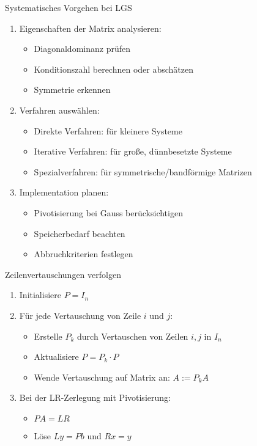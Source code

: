 \begin{KR}{Systematisches Vorgehen bei LGS}
\begin{enumerate}
    \item Eigenschaften der Matrix analysieren:
    \begin{itemize}
        \item Diagonaldominanz prüfen
        \item Konditionszahl berechnen oder abschätzen
        \item Symmetrie erkennen
    \end{itemize}
    
    \item Verfahren auswählen:
    \begin{itemize}
        \item Direkte Verfahren: für kleinere Systeme
        \item Iterative Verfahren: für große, dünnbesetzte Systeme
        \item Spezialverfahren: für symmetrische/bandförmige Matrizen
    \end{itemize}
    
    \item Implementation planen:
    \begin{itemize}
        \item Pivotisierung bei Gauss berücksichtigen
        \item Speicherbedarf beachten
        \item Abbruchkriterien festlegen
    \end{itemize}
\end{enumerate}
\end{KR}

\begin{KR}{Zeilenvertauschungen verfolgen}
\begin{enumerate}
    \item Initialisiere $P = I_n$
    \item Für jede Vertauschung von Zeile $i$ und $j$:
    \begin{itemize}
        \item Erstelle $P_k$ durch Vertauschen von Zeilen $i,j$ in $I_n$
        \item Aktualisiere $P = P_k \cdot P$
        \item Wende Vertauschung auf Matrix an: $A := P_kA$
    \end{itemize}
    \item Bei der LR-Zerlegung mit Pivotisierung:
    \begin{itemize}
        \item $PA = LR$ 
        \item Löse $Ly = Pb$ und $Rx = y$
    \end{itemize}
\end{enumerate}
\end{KR}



